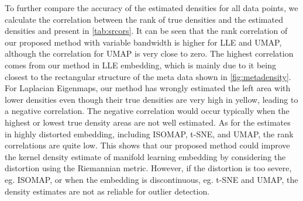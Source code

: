 \documentclass[11pt,a4paper,]{article}
\begin{document}
To further compare the accuracy of the estimated densities for all data points, we calculate the correlation between the rank of true densities and the estimated densities and present in \autoref{tab:srcors}. It can be seen that the rank correlation of our proposed method with variable bandwidth is higher for LLE and UMAP, although the correlation for UMAP is very close to zero. The highest correlation comes from our method in LLE embedding, which is mainly due to it being closest to the
rectangular structure of the meta data shown in \autoref{fig:metadensity}. For Laplacian Eigenmaps, our method has wrongly estimated the left area with lower densities even though their true densities are very high in yellow, leading to a negative
correlation. The negative correlation would occur typically when the highest or lowest true density areas are not well estimated. As for the estimates in highly distorted embedding, including ISOMAP, t-SNE, and UMAP, the rank correlations are quite low. This shows that our proposed method could improve the kernel density estimate of manifold learning embedding by considering the distortion using the Riemannian metric.
However, if the distortion is too severe, eg. ISOMAP, or when the embedding is discontinuous, eg. t-SNE and UMAP, the density estimates are not as reliable for outlier detection.

\printbibliography
\end{document}
